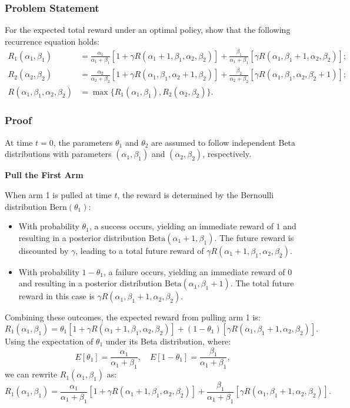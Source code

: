 \documentclass[11pt]{article}
\begin{document}
\subsubsection*{Problem Statement}
For the expected total reward under an optimal policy, show that the following recurrence equation holds:
\begin{align*}
R_1(\alpha_1, \beta_1) &= \frac{\alpha_1}{\alpha_1 + \beta_1}[1 + \gamma R(\alpha_1 + 1, \beta_1, \alpha_2, \beta_2)] + \frac{\beta_1}{\alpha_1 + \beta_1}[\gamma R(\alpha_1, \beta_1 + 1, \alpha_2, \beta_2)]; \\
R_2(\alpha_2, \beta_2) &= \frac{\alpha_2}{\alpha_2 + \beta_2}[1 + \gamma R(\alpha_1, \beta_1, \alpha_2 + 1, \beta_2)]  + \frac{\beta_2}{\alpha_2 + \beta_2}[\gamma R(\alpha_1, \beta_1, \alpha_2, \beta_2 + 1)]; \\
R(\alpha_1, \beta_1, \alpha_2, \beta_2) &= \max \{R_1(\alpha_1, \beta_1), R_2(\alpha_2, \beta_2)\}.
\end{align*}

\subsubsection*{Proof}

At time \( t = 0 \), the parameters \(\theta_1\) and \(\theta_2\) are assumed to follow independent Beta distributions with parameters \((\alpha_1, \beta_1)\) and \((\alpha_2, \beta_2)\), respectively.

\vspace{1em}
\noindent\textbf{Pull the First Arm}

When arm 1 is pulled at time \( t \), the reward is determined by the Bernoulli distribution \( \text{Bern}(\theta_1) \):
\begin{itemize}
    \item With probability \(\theta_1\), a success occurs, yielding an immediate reward of \( 1 \) and resulting in a posterior distribution \( \text{Beta}(\alpha_1 + 1, \beta_1) \). The future reward is discounted by \(\gamma\), leading to a total future reward of \(\gamma R(\alpha_1 + 1, \beta_1, \alpha_2, \beta_2)\).
    \item With probability \(1 - \theta_1\), a failure occurs, yielding an immediate reward of \( 0 \) and resulting in a posterior distribution \( \text{Beta}(\alpha_1, \beta_1 + 1) \). The total future reward in this case is \(\gamma R(\alpha_1, \beta_1 + 1, \alpha_2, \beta_2)\).
\end{itemize}
Combining these outcomes, the expected reward from pulling arm 1 is:
\[
R_1(\alpha_1, \beta_1) = \theta_1 [1 + \gamma R(\alpha_1 + 1, \beta_1, \alpha_2, \beta_2)] + (1 - \theta_1) [\gamma R(\alpha_1, \beta_1 + 1, \alpha_2, \beta_2)].
\]
Using the expectation of \(\theta_1\) under its Beta distribution, where:
\[
E[\theta_1] = \frac{\alpha_1}{\alpha_1 + \beta_1}, \quad E[1 - \theta_1] = \frac{\beta_1}{\alpha_1 + \beta_1},
\]
we can rewrite \(R_1(\alpha_1, \beta_1)\) as:
\[
R_1(\alpha_1, \beta_1) = \frac{\alpha_1}{\alpha_1 + \beta_1} [1 + \gamma R(\alpha_1 + 1, \beta_1, \alpha_2, \beta_2)] + \frac{\beta_1}{\alpha_1 + \beta_1} [\gamma R(\alpha_1, \beta_1 + 1, \alpha_2, \beta_2)].
\]
\end{document}
